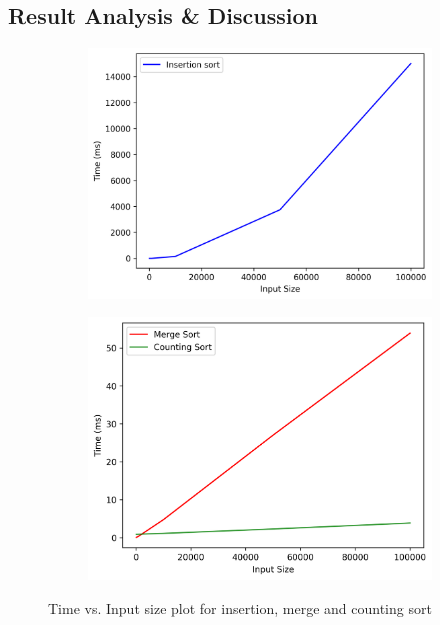 \subsection{Result Analysis \& Discussion}
\begin{figure}[H]
    \centering
    \begin{subfigure}[b]{0.4\textwidth}
        \centering
        \includegraphics[width=\textwidth]{task1_insertion.png}
    \end{subfigure}
    \hfill
    \begin{subfigure}[b]{0.4\textwidth}
        \centering
        \includegraphics[width=\textwidth]{task1_merge_count.png}
    \end{subfigure}

    \caption{Time vs. Input size plot for insertion, merge and counting sort}
\end{figure}

